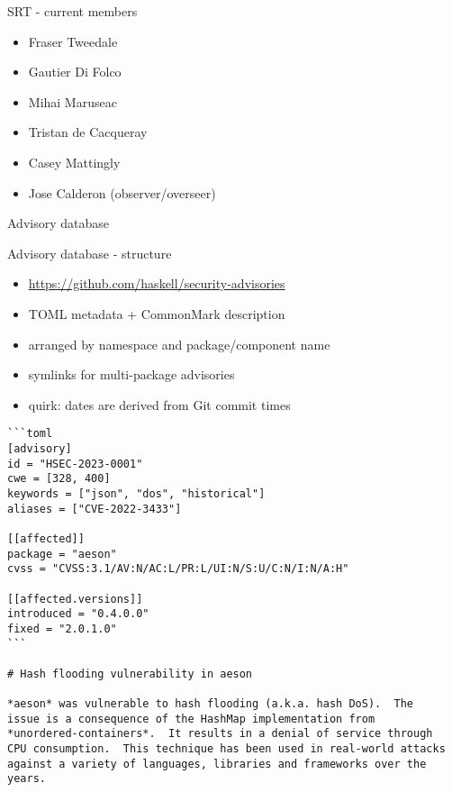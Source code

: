 \documentclass[ignorenonframetext,aspectratio=169,12pt]{beamer}
\begin{document}
\begin{frame}{SRT - current members}
    \begin{itemize}
        \item Fraser Tweedale
        \item Gautier Di Folco
        \item Mihai Maruseac
        \item Tristan de Cacqueray
        \item Casey Mattingly
        \item Jose Calderon (observer/overseer)
    \end{itemize}
\end{frame}

\begin{frame}
\centering
\Large
  Advisory database
\end{frame}

\begin{frame}{Advisory database - structure}
  \begin{itemize}
    \item \url{https://github.com/haskell/security-advisories}
    \item TOML metadata + CommonMark description
    \item arranged by namespace and package/component name
    \item symlinks for multi-package advisories
    \item quirk: dates are derived from Git commit times
  \end{itemize}
\end{frame}

\begin{frame}[fragile]
\scriptsize
\begin{verbatim}
```toml
[advisory]
id = "HSEC-2023-0001"
cwe = [328, 400]
keywords = ["json", "dos", "historical"]
aliases = ["CVE-2022-3433"]

[[affected]]
package = "aeson"
cvss = "CVSS:3.1/AV:N/AC:L/PR:L/UI:N/S:U/C:N/I:N/A:H"

[[affected.versions]]
introduced = "0.4.0.0"
fixed = "2.0.1.0"
```

# Hash flooding vulnerability in aeson

*aeson* was vulnerable to hash flooding (a.k.a. hash DoS).  The
issue is a consequence of the HashMap implementation from
*unordered-containers*.  It results in a denial of service through
CPU consumption.  This technique has been used in real-world attacks
against a variety of languages, libraries and frameworks over the
years.

\end{verbatim}
\end{frame}
\end{document}
